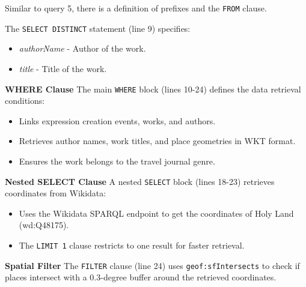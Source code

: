 Similar to query 5, there is a definition of prefixes and the \texttt{FROM} clause.

The \texttt{SELECT DISTINCT} statement (line 9) specifies:
\begin{itemize}
    \item \textit{authorName} - Author of the work.
    \item \textit{title} - Title of the work.
\end{itemize}

\textbf{WHERE Clause}
The main \texttt{WHERE} block (lines 10-24) defines the data retrieval conditions:
\begin{itemize}
    \item Links expression creation events, works, and authors.
    \item Retrieves author names, work titles, and place geometries in WKT format.
    \item Ensures the work belongs to the travel journal genre.
\end{itemize}

\textbf{Nested SELECT Clause}
A nested \texttt{SELECT} block (lines 18-23) retrieves coordinates from Wikidata:
\begin{itemize}
    \item Uses the Wikidata SPARQL endpoint to get the coordinates of Holy Land (wd:Q48175).
    \item The \texttt{LIMIT 1} clause restricts to one result for faster retrieval.
\end{itemize}

\textbf{Spatial Filter}
The \texttt{FILTER} clause (line 24) uses \texttt{geof:sfIntersects} to check if places intersect with a 0.3-degree buffer around the retrieved coordinates.

